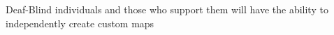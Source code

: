 Deaf-Blind individuals and those who support them will have the ability to independently create custom maps
